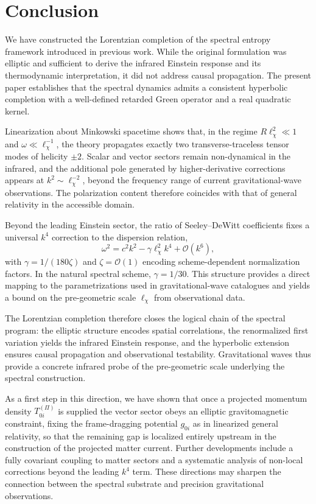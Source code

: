 \section{Conclusion}
  \label{sec:conclusion}

  We have constructed the Lorentzian completion of the spectral entropy framework introduced in previous work.
  While the original formulation was elliptic and sufficient to derive
  the infrared Einstein response and its thermodynamic interpretation, it did not address causal propagation.
  The present paper establishes that the spectral dynamics admits a
  consistent hyperbolic completion with a well-defined retarded Green operator and a real quadratic kernel.

  Linearization about Minkowski spacetime shows that, in the regime
  $R\ell_\chi^2 \ll 1$ and $\omega \ll \ell_\chi^{-1}$,
  the theory propagates exactly two transverse-traceless tensor modes of helicity $\pm 2$.
  Scalar and vector sectors remain non-dynamical in the infrared,
  and the additional pole generated by higher-derivative corrections
  appears at $k^2 \sim \ell_\chi^{-2}$, beyond the frequency range of current gravitational-wave observations.
  The polarization content therefore coincides with that of general relativity in the accessible domain.

  Beyond the leading Einstein sector, the ratio of Seeley--DeWitt
  coefficients fixes a universal $k^4$ correction to the dispersion relation,
  \[
    \omega^2
    =
    c^2 k^2
    -
    \gamma \ell_\chi^2 k^4
    +
    \mathcal{O}(k^6),
  \]
  with $\gamma = 1/(180\zeta)$ and $\zeta=\mathcal{O}(1)$ encoding scheme-dependent normalization factors.
  In the natural spectral scheme, $\gamma=1/30$.
  This structure provides a direct mapping to the parametrizations used
  in gravitational-wave catalogues and yields a bound on the pre-geometric scale $\ell_\chi$ from observational data.

  The Lorentzian completion therefore closes the logical chain of the spectral program:
  the elliptic structure encodes spatial correlations,
  the renormalized first variation yields the infrared Einstein response,
  and the hyperbolic extension ensures causal propagation and observational testability.
  Gravitational waves thus provide a concrete infrared probe of the
  pre-geometric scale underlying the spectral construction.

  As a first step in this direction, we have shown that once a projected momentum density $T^{(\Pi)}_{0i}$ is
  supplied the vector sector obeys an elliptic gravitomagnetic constraint, fixing the frame-dragging potential
  $g_{0i}$ as in linearized general relativity, so that the remaining gap is localized entirely upstream in the
  construction of the projected matter current.
  Further developments include a fully covariant coupling to matter
  sectors and a systematic analysis of non-local corrections beyond the leading $k^4$ term.
  These directions may sharpen the connection between the spectral
  substrate and precision gravitational observations.
